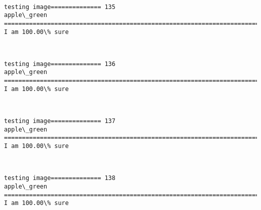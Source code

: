 \documentclass[11pt]{article}
\begin{document}
    \begin{center}
    \end{center}
    { \hspace*{\fill} \\}
    
    \begin{Verbatim}[commandchars=\\\{\}]
testing image============== 135
apple\_green
============================================================================
I am 100.00\% sure

    \end{Verbatim}

    \begin{center}
    \end{center}
    { \hspace*{\fill} \\}
    
    \begin{Verbatim}[commandchars=\\\{\}]
testing image============== 136
apple\_green
============================================================================
I am 100.00\% sure

    \end{Verbatim}

    \begin{center}
    \end{center}
    { \hspace*{\fill} \\}
    
    \begin{Verbatim}[commandchars=\\\{\}]
testing image============== 137
apple\_green
============================================================================
I am 100.00\% sure

    \end{Verbatim}

    \begin{center}
    \end{center}
    { \hspace*{\fill} \\}
    
    \begin{Verbatim}[commandchars=\\\{\}]
testing image============== 138
apple\_green
============================================================================
I am 100.00\% sure

    \end{Verbatim}
\end{document}
